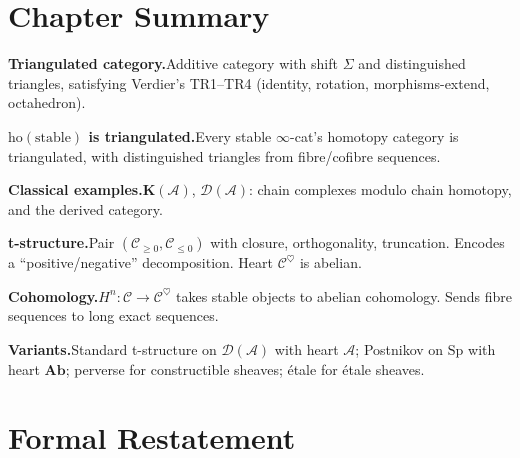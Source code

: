 \section*{Chapter Summary}

\begin{summarybox}
\textbf{Triangulated category.}\quad Additive category with shift
$\Sigma$ and distinguished triangles, satisfying Verdier's TR1--TR4
(identity, rotation, morphisms-extend, octahedron).

\textbf{$\mathrm{ho}(\mathrm{stable})$ is triangulated.}\quad Every
stable $\infty$-cat's homotopy category is triangulated, with
distinguished triangles from fibre/cofibre sequences.

\textbf{Classical examples.}\quad $\mathbf{K}(\mathcal{A})$, $\mathcal{D}(\mathcal{A})$:
chain complexes modulo chain homotopy, and the derived category.

\textbf{t-structure.}\quad Pair $(\mathcal{C}_{\geq 0}, \mathcal{C}_{\leq 0})$
with closure, orthogonality, truncation. Encodes a ``positive/negative''
decomposition. Heart $\mathcal{C}^\heartsuit$ is abelian.

\textbf{Cohomology.}\quad $H^n : \mathcal{C} \to \mathcal{C}^\heartsuit$
takes stable objects to abelian cohomology. Sends fibre sequences to
long exact sequences.

\textbf{Variants.}\quad Standard t-structure on $\mathcal{D}(\mathcal{A})$
with heart $\mathcal{A}$; Postnikov on $\mathrm{Sp}$ with heart $\mathbf{Ab}$;
perverse for constructible sheaves; étale for étale sheaves.
\end{summarybox}


\section*{Formal Restatement}

